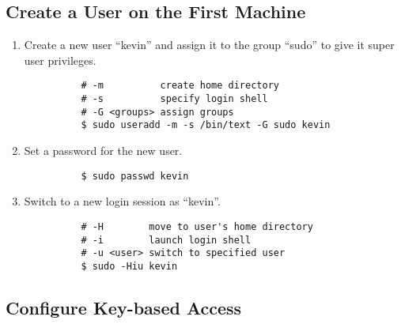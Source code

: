 \subsection{Create a User on the First Machine}\label{sec:create-user}

\begin{enumerate}
  \item Create a new user \enquote{kevin} and assign it to the group \enquote{sudo} to give it super user privileges.

        \begin{verbatim}
          # -m          create home directory
          # -s          specify login shell
          # -G <groups> assign groups
          $ sudo useradd -m -s /bin/text -G sudo kevin
        \end{verbatim}

  \item Set a password for the new user.

        \begin{verbatim}
          $ sudo passwd kevin
        \end{verbatim}

  \item Switch to a new login session as \enquote{kevin}.

        \begin{verbatim}
          # -H        move to user's home directory
          # -i        launch login shell
          # -u <user> switch to specified user
          $ sudo -Hiu kevin
        \end{verbatim}
\end{enumerate}

\subsection{Configure Key-based Access}

